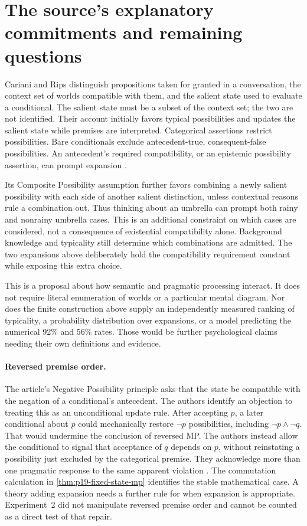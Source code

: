 \section{The source's explanatory commitments and remaining questions}
\label{sec:p19-conditional-context-explanations}

Cariani and Rips distinguish propositions taken for granted in a conversation,
the context set of worlds compatible with them, and the salient state used
to evaluate a conditional. The salient state must be a subset of the context
set; the two are not identified. Their account initially favors typical
possibilities and updates the salient state while premises are interpreted.
Categorical assertions restrict possibilities. Bare conditionals exclude
antecedent-true, consequent-false possibilities. An antecedent's required
compatibility, or an epistemic possibility assertion, can prompt expansion
\cite[Secs.~3--5.4]{CarianiRips2017Suppression}.

Its Composite Possibility assumption further favors combining a newly salient
possibility with each side of another salient distinction, unless contextual
reasons rule a combination out. Thus thinking about an umbrella can prompt
both rainy and nonrainy umbrella cases. This is an additional constraint on
which cases are considered, not a consequence of existential compatibility
alone. Background knowledge and typicality still determine which combinations
are admitted. The two expansions above deliberately hold the compatibility
requirement constant while exposing this extra choice.

This is a proposal about how semantic and pragmatic processing interact.
It does not require literal enumeration of worlds or a particular mental
diagram. Nor does the finite construction above supply an independently
measured ranking of typicality, a probability distribution over expansions,
or a model predicting the numerical 92\% and 56\% rates. Those would be
further psychological claims needing their own definitions and evidence.

\paragraph{Reversed premise order.}
The article's Negative Possibility principle asks that the state be compatible
with the negation of a conditional's antecedent. The authors identify an
objection to treating this as an unconditional update rule. After accepting \(p\), a later
conditional about \(p\) could mechanically restore \(\neg p\) possibilities,
including \(\neg p\land\neg q\). That would undermine the conclusion of
reversed MP. The authors instead allow the conditional to signal that
acceptance of \(q\) depends on \(p\), without reinstating a possibility
just excluded by the categorical premise. They acknowledge more than one
pragmatic response to the same apparent violation
\cite[Sec.~5.3]{CarianiRips2017Suppression}.
The commutation calculation in \cref{thm:p19-fixed-state-mp} identifies the
stable mathematical case. A theory adding expansion needs a further rule
for when expansion is appropriate. Experiment~2 did not manipulate reversed
premise order and cannot be counted as a direct test of that repair.

